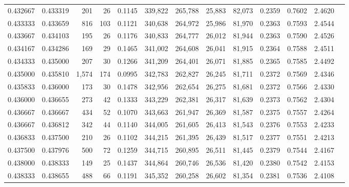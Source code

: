 \begin{tabular}{rrrrrrrrrrrrr}
0.432667 & 0.433319 &   201 &  26 &                                     0.1145 & 339,822 & 265,788 &  25,883 &  82,073 & 0.2359 & 0.7602 & 2.4620 \\
0.433333 & 0.433659 &   816 & 103 &                                     0.1121 & 340,638 & 264,972 &  25,986 &  81,970 & 0.2363 & 0.7593 & 2.4544 \\
0.433667 & 0.434103 &   195 &  26 &                                     0.1176 & 340,833 & 264,777 &  26,012 &  81,944 & 0.2363 & 0.7590 & 2.4526 \\
0.434167 & 0.434286 &   169 &  29 &                                     0.1465 & 341,002 & 264,608 &  26,041 &  81,915 & 0.2364 & 0.7588 & 2.4511 \\
0.434333 & 0.435000 &   207 &  30 &                                     0.1266 & 341,209 & 264,401 &  26,071 &  81,885 & 0.2365 & 0.7585 & 2.4492 \\
0.435000 & 0.435810 & 1,574 & 174 &                                     0.0995 & 342,783 & 262,827 &  26,245 &  81,711 & 0.2372 & 0.7569 & 2.4346 \\
0.435833 & 0.436000 &   173 &  30 &                                     0.1478 & 342,956 & 262,654 &  26,275 &  81,681 & 0.2372 & 0.7566 & 2.4330 \\
0.436000 & 0.436655 &   273 &  42 &                                     0.1333 & 343,229 & 262,381 &  26,317 &  81,639 & 0.2373 & 0.7562 & 2.4304 \\
0.436667 & 0.436667 &   434 &  52 &                                     0.1070 & 343,663 & 261,947 &  26,369 &  81,587 & 0.2375 & 0.7557 & 2.4264 \\
0.436667 & 0.436812 &   342 &  44 &                                     0.1140 & 344,005 & 261,605 &  26,413 &  81,543 & 0.2376 & 0.7553 & 2.4233 \\
0.436833 & 0.437500 &   210 &  26 &                                     0.1102 & 344,215 & 261,395 &  26,439 &  81,517 & 0.2377 & 0.7551 & 2.4213 \\
0.437500 & 0.437976 &   500 &  72 &                                     0.1259 & 344,715 & 260,895 &  26,511 &  81,445 & 0.2379 & 0.7544 & 2.4167 \\
0.438000 & 0.438333 &   149 &  25 &                                     0.1437 & 344,864 & 260,746 &  26,536 &  81,420 & 0.2380 & 0.7542 & 2.4153 \\
0.438333 & 0.438655 &   488 &  66 &                                     0.1191 & 345,352 & 260,258 &  26,602 &  81,354 & 0.2381 & 0.7536 & 2.4108 \\

\end{tabular}
